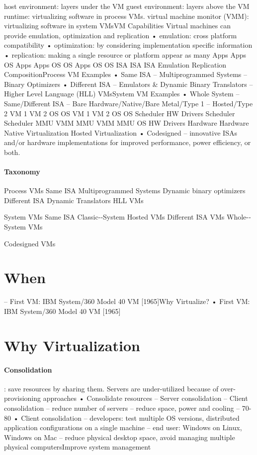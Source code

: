 \documentclass[10pt]{article}
\begin{document}
host environment: layers under the VM
guest environment: layers above the VM
runtime: virtualizing software in process VMs.
virtual machine monitor (VMM): virtualizing software
in system VMsVM Capabilities
Virtual machines can provide emulation, optimization
and replication
•  emulation: cross platform compatibility
•  optimization: by considering implementation specific
information
•  replication: making a single resource or platform appear as
many
Apps
Apps
OS
Apps
Apps
OS
OS
Apps
OS
OS
ISA ISA ISA
Emulation Replication CompositionProcess VM Examples
•  Same ISA
–  Multiprogrammed Systems
–  Binary Optimizers
•  Different ISA
–  Emulators \& Dynamic Binary Translators
–  Higher Level Language (HLL) VMsSystem VM Examples
•  Whole System
–  Same/Different ISA
–  Bare Hardware/Native/Bare Metal/Type 1
–  Hosted/Type 2
VM 1 VM 2
OS OS
VM 1 VM 2 OS OS Scheduler
HW
Drivers Scheduler
Scheduler
MMU
VMM
MMU
VMM MMU
OS HW
Drivers
Hardware Hardware
Native Virtualization Hosted Virtualization
•  Codesigned
–  innovative ISAs and/or hardware implementations for
improved performance, power efficiency, or both.


\paragraph{Taxonomy}

Process	VMs	
	Same ISA	
		Multiprogrammed	Systems	
		Dynamic	binary optimizers
	Different	 ISA	
		Dynamic	Translators
		HLL	 VMs	
 	 
System	VMs	
    Same ISA	
    	Classic-­‐System
    	Hosted VMs	
  	Different ISA VMs	
   		Whole-­‐System VMs	
   		
   		Codesigned VMs
  
\section{When}

–  First VM: IBM System/360 Model 40 VM [1965]Why Virtualize?
• First VM: IBM System/360 Model 40 VM [1965]

\section{Why Virtualization}

\paragraph{Consolidation}:
save resources by sharing them. Servers are under-utilized
because of over-provisioning approaches
•  Consolidate resources
–  Server consolidation
–  Client consolidation
–  reduce number of servers
–  reduce space, power and cooling
–  70-80%
•  Client consolidation
–  developers: test multiple OS versions, distributed
application configurations on a single machine
–  end user: Windows on Linux, Windows on Mac
–  reduce physical desktop space, avoid managing
multiple physical computersImprove system management
\end{document}
